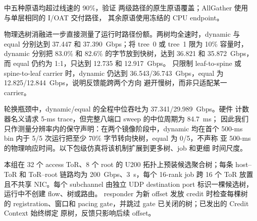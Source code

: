 \begin{table}[t]
\centering
\small
\caption{物理两级数据路径的原语覆盖。链路等效列对 AllGather 和
ReduceScatter 乘以 $N-1=3$；利用率以固定 40-Gbps host link 为分母。}
\label{tab:physical-ml2-primitives}
\setlength{\tabcolsep}{4pt}
\end{table}

 中五种原语均超过线速的 90\%，验证
两级路径的原生原语覆盖；AllGather 使用与单层相同的 I/OAT 交付路径，
其余原语使用冻结的 CPU endpoint。

物理选树消融进一步直接测量了运行时路径份额。两树均全速时，dynamic 与
equal 分别达到 37.447 和 37.390~Gbps；将 tree~0 或 tree~1 限为 10\%
容量时，dynamic 分别把 83.0\% 和 82.6\% 的字节放到快树，达到 36.821 和
35.872~Gbps，而 equal 仍约为 1:1，只达到 12.735 和 12.917~Gbps。
只限制 leaf-to-spine 或 spine-to-leaf carrier 时，dynamic 仍达到
36.543/36.743~Gbps，equal 为 12.825/12.844~Gbps，说明反馈能跨两个方向
避开慢树，而非只适配某一 carrier。

轮换瓶颈中，dynamic/equal 的全程中位吞吐为 37.341/29.989~Gbps。硬件
计数器名义请求 5-ms trace，但完整八端口 sweep 的中位周期为 84.7~ms；
因此我们只作测量分辨率内的保守声明：在两个镜像阶段中，dynamic 均在首个
500-ms bin 内于 5/5 次运行把至少 70\% 字节转向快树，equal 为 0/5，不声称
亚 500-ms 的物理响应时间。以下包级仿真将该机制扩展到更多树、job 和更细
时间尺度。

本组在 32 个 access ToR、8 个 root 的 U200 拓扑上预装候选聚合树；每条
host--ToR 和 ToR--root 链路均为 200~Gbps、3~\textmu s，每个 16-rank
job 跨 16 个 ToR 放置且不共享 NIC。每个 subchannel 由独立 UDP
destination port 标识一棵候选树，运行中不创建 flow、树或路由。
responder 为新 offset 发放 credit 时检查每棵树的 registration、窗口和
pacing gate，并跳过 gate 已关闭的树；已发出的 Credit Context 始终绑定
原树，反馈只影响后续 offset。

